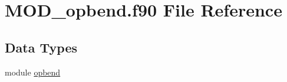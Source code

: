 \hypertarget{MOD__opbend_8f90}{\section{M\-O\-D\-\_\-opbend.\-f90 File Reference}
\label{MOD__opbend_8f90}
}
\subsection*{Data Types}
\begin{DoxyCompactItemize}
\item 
module \hyperlink{classopbend}{opbend}
\end{DoxyCompactItemize}

